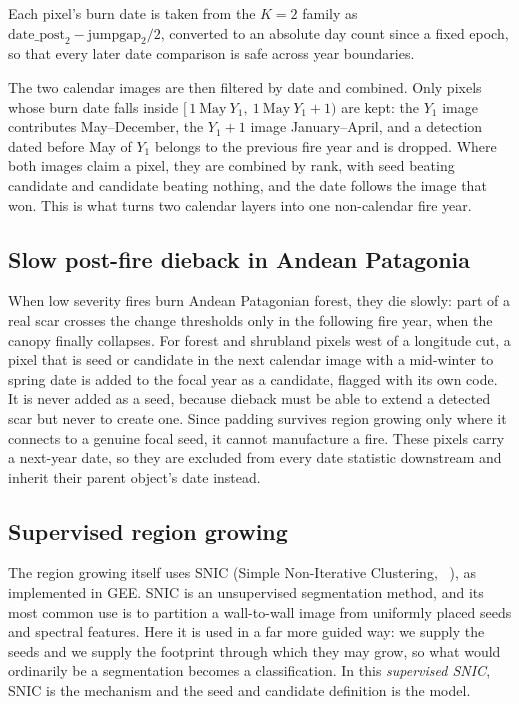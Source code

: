 \documentclass[11pt,a4paper]{article}
\begin{document}
Each pixel's burn date is taken from the \(K=2\) family as
\(\mathrm{date\_post}_2 - \mathrm{jumpgap}_2/2\), converted to an absolute day count since a fixed
epoch, so that every later date comparison is safe across year boundaries.

The two calendar images are then filtered by date and combined. Only pixels whose burn date falls
inside \([\,1\ \mathrm{May}\ Y_1,\ 1\ \mathrm{May}\ Y_1{+}1)\) are kept: the \(Y_1\) image
contributes May--December, the \(Y_1{+}1\) image January--April, and a detection dated before May
of \(Y_1\) belongs to the previous fire year and is dropped. Where both images claim a pixel, they
are combined by rank, with seed beating candidate and candidate beating nothing, and the date
follows the image that won. This is what turns two calendar layers into one non-calendar fire year.

\subsection{Slow post-fire dieback in Andean Patagonia}

When low severity fires burn Andean Patagonian forest, they die slowly: 
part of a real scar crosses the change thresholds
only in the following fire year, when the canopy finally collapses. For forest and shrubland
pixels west of a longitude cut, a pixel that is seed or candidate in the next calendar image with
a mid-winter to spring date is added to the focal year as a candidate, flagged with its own code.
It is never added as a seed, because dieback must be able to extend a detected scar but never to
create one. Since padding survives region growing only where it connects to a genuine focal seed,
it cannot manufacture a fire. These pixels carry a next-year date, so they are excluded from every
date statistic downstream and inherit their parent object's date instead.

\subsection{Supervised region growing}

The region growing itself uses SNIC (Simple Non-Iterative Clustering,
\citeauthor{AchantaSNIC}~\citeyear{AchantaSNIC}), as implemented in GEE. SNIC is an unsupervised
segmentation method, and its most common use is to partition a wall-to-wall image from uniformly
placed seeds and spectral features. Here it is used in a far more guided way: we supply the seeds
and we supply the footprint through which they may grow, so what would ordinarily be a
segmentation becomes a classification. In this \emph{supervised SNIC}, SNIC is the mechanism and
the seed and candidate definition is the model.
\end{document}
